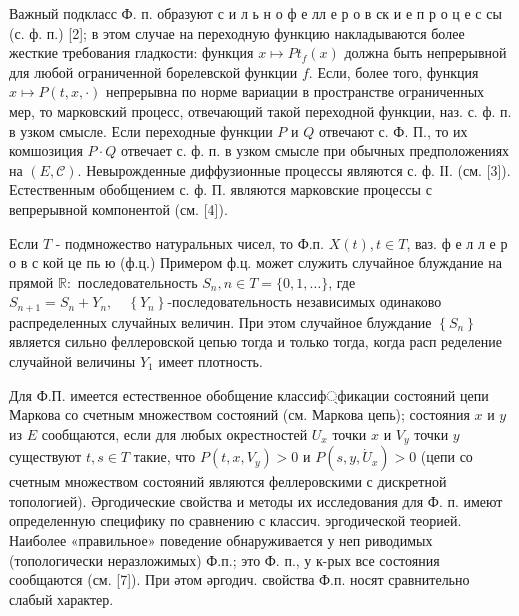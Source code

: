 \documentclass[10pt]{article}
\begin{document}
Важный подкласс Ф. п. образуют с и л ь н о ф е лл е р о в ск и е п р о ц е с сы (с. ф. п.) [2]; в этом случае на переходную функцию накладываются более жесткие требования гладкости: функция $x \longmapsto P t_{f}(x)$ должна быть непрерывной для любой ограниченной борелевской функции $f$. Если, более того, функция $x \longmapsto P(t, x, \cdot)$ непрерывна по норме вариации в пространстве ограниченных мер, то марковский процесс, отвечающий такой переходной функции, наз. с. ф. п. в узком смысле. Если переходные функции $P$ и $Q$ отвечают с. Ф. П., то их комшозиция $P \cdot Q$ отвечает с. ф. п. в узком смысле при обычных предположениях на $(E, \mathscr{C})$. Невырожденные диффузионные процессы являются с. ф. ІІ. (см. [3]). Естественным обобщением с. ф. П. являются марковские процессы с вепрерывной компонентой (см. [4]).



Если $T$ - подмножество натуральных чисел, то Ф.п. $X(t), t \in T$, ваз. ф е л л е р о в с кой це пь ю (ф.ц.) Примером ф.ц. может служить случайное блуждание на прямой $\mathbb{R}:$ последовательность $S_{n}, n \in T=\{0,1, \ldots\}$, где $S_{n+1}=S_{n}+Y_{n}, \quad\left\{Y_{n}\right\}$-последовательность независимых одинаково распределенных случайных величин. При этом случайное блуждание $\left\{S_{n}\right\}$ является сильно феллеровской цепью тогда и только тогда, когда расп ределение случайной величины $Y_{1}$ имеет плотность.



Для Ф.П. имеется естественное обобщение классиф্фикации состояний цепи Маркова со счетным множеством состояний (см. Маркова цепь); состояния $x$ и $y$ из $E$ сообщаются, если для любых окрестностей $U_{x}$ точки $x$ и $V_{y}$ точки $y$ существуют $t, s \in T$ такие, что $P\left(t, x, V_{y}\right)>0$ и $P\left(s, y, \dot{U}_{x}\right)>0$ (цепи со счетным множеством состояний являются феллеровскими с дискретной топологией). Әргодические свойства и методы их исследования для Ф. п. имеют определенную специфику по сравнению с классич. эргодической теорией. Наиболее «правильное» поведение обнаруживается у неп риводимых (топологически неразложимых) Ф.п.; это Ф. п., у к-рых все состояния сообщаются (см. [7]). При әтом әргодич. свойства Ф.п. носят сравнительно слабый характер.
\end{document}
